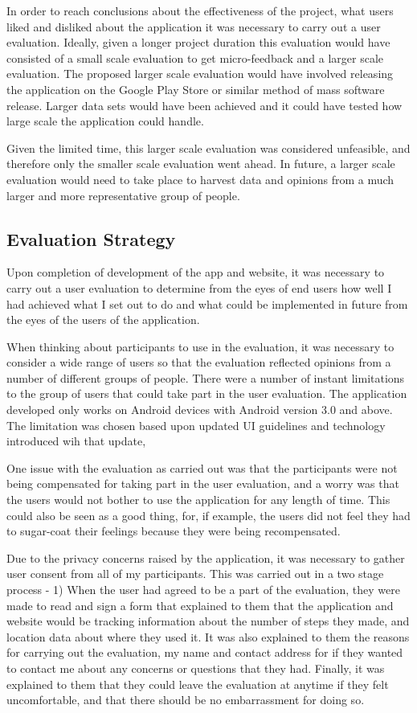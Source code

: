 \documentclass{l4proj}
\begin{document}
In order to reach conclusions about the effectiveness of the project, what users liked and disliked about the application it was necessary to carry out a user evaluation. Ideally, given a longer project duration this evaluation would have consisted of a small scale evaluation to get micro-feedback and a larger scale evaluation. The proposed larger scale evaluation would have involved releasing the application on the Google Play Store or similar method of mass software release. Larger data sets would have been achieved and it could have tested how large scale the application could handle.

Given the limited time, this larger scale evaluation was considered unfeasible, and therefore only the smaller scale evaluation went ahead. In future, a larger scale evaluation would need to take place to harvest data and opinions from a much larger and more representative group of people.

\subsection{Evaluation Strategy}

Upon completion of development of the app and website, it was necessary to carry out a user evaluation to determine from the eyes of end users how well I had achieved what I set out to do and what could be implemented in future from the eyes of the users of the application.

When thinking about participants to use in the evaluation, it was necessary to consider a wide range of users so that the evaluation reflected opinions from a number of different groups of people. There were a number of instant limitations to the group of users that could take part in the user evaluation. The application developed only works on Android devices with Android version 3.0 and above. The limitation was chosen based upon updated UI guidelines and technology introduced wih that update, 

One issue with the evaluation as carried out was that the participants were not being compensated for taking part in the user evaluation, and a worry was that the users would not bother to use the application for any length of time. This could also be seen as a good thing, for, if example, the users did not feel they had to sugar-coat their feelings because they were being recompensated.
 
Due to the privacy concerns raised by the application, it was necessary to gather user consent from all of my participants. This was carried out in a two stage process - 1) When the user had agreed to be a part of the evaluation, they were made to read and sign a form that explained to them that the application and website would be tracking information about the number of steps they made, and location data about where they used it. It was also explained to them the reasons for carrying out the evaluation, my name and contact address for if they wanted to contact me about any concerns or questions that they had. Finally, it was explained to them that they could leave the evaluation at anytime if they felt uncomfortable, and that there should be no embarrassment for doing so.
\end{document}
